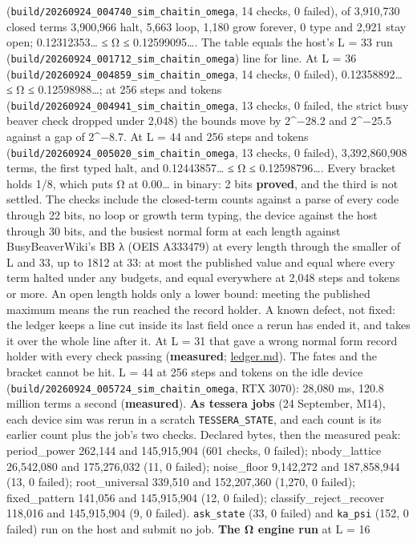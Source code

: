 \begin{description}
(\texttt{build/\allowbreak{}20260924\_\allowbreak{}004740\_\allowbreak{}sim\_\allowbreak{}chaitin\_\allowbreak{}omega}, 14 checks, 0 failed), of 3,910,730 closed terms 3,900,966 halt, 5,663 loop, 1,180 grow forever, 0 type and 2,921 stay open; 0.12312353… ≤ Ω ≤ 0.12599095…. The table equals the host's L = 33 run (\texttt{build/\allowbreak{}20260924\_\allowbreak{}001712\_\allowbreak{}sim\_\allowbreak{}chaitin\_\allowbreak{}omega}) line for line. At L = 36 (\texttt{build/\allowbreak{}20260924\_\allowbreak{}004859\_\allowbreak{}sim\_\allowbreak{}chaitin\_\allowbreak{}omega}, 14 checks, 0 failed), 0.12358892… ≤ Ω ≤ 0.12598988…; at 256 steps and tokens (\texttt{build/\allowbreak{}20260924\_\allowbreak{}004941\_\allowbreak{}sim\_\allowbreak{}chaitin\_\allowbreak{}omega}, 13 checks, 0 failed, the strict busy beaver check dropped under 2,048) the bounds move by 2\textasciicircum{}−28.2 and 2\textasciicircum{}−25.5 against a gap of 2\textasciicircum{}−8.7. At L = 44 and 256 steps and tokens (\texttt{build/\allowbreak{}20260924\_\allowbreak{}005020\_\allowbreak{}sim\_\allowbreak{}chaitin\_\allowbreak{}omega}, 13 checks, 0 failed), 3,392,860,908 terms, the first typed halt, and 0.12443857… ≤ Ω ≤ 0.12598796…. Every bracket holds 1/8, which puts Ω at 0.00… in binary: 2 bits \textbf{proved}, and the third is not settled. The checks include the closed-term counts against a parse of every code through 22 bits, no loop or growth term typing, the device against the host through 30 bits, and the busiest normal form at each length against BusyBeaverWiki's BB λ (OEIS A333479) at every length through the smaller of L and 33, up to 1812 at 33: at most the published value and equal where every term halted under any budgets, and equal everywhere at 2,048 steps and tokens or more. An open length holds only a lower bound: meeting the published maximum means the run reached the record holder. A known defect, not fixed: the ledger keeps a line cut inside its last field once a rerun has ended it, and takes it over the whole line after it. At L = 31 that gave a wrong normal form record holder with every check passing (\textbf{measured}; \hyperref[chap:ledger]{ledger.md}). The fates and the bracket cannot be hit. L = 44 at 256 steps and tokens on the idle device (\texttt{build/\allowbreak{}20260924\_\allowbreak{}005724\_\allowbreak{}sim\_\allowbreak{}chaitin\_\allowbreak{}omega}, RTX 3070): 28,080 ms, 120.8 million terms a second (\textbf{measured}). \textbf{As tessera jobs} (24 September, M14), each device sim was rerun in a scratch \texttt{TESSERA\_\allowbreak{}STATE}, and each count is its earlier count plus the job's two checks. Declared bytes, then the measured peak: period\_\allowbreak{}power 262,144 and 145,915,904 (601 checks, 0 failed); nbody\_\allowbreak{}lattice 26,542,080 and 175,276,032 (11, 0 failed); noise\_\allowbreak{}floor 9,142,272 and 187,858,944 (13, 0 failed); root\_\allowbreak{}universal 339,510 and 152,207,360 (1,270, 0 failed); fixed\_\allowbreak{}pattern 141,056 and 145,915,904 (12, 0 failed); classify\_\allowbreak{}reject\_\allowbreak{}recover 118,016 and 145,915,904 (9, 0 failed). \texttt{ask\_\allowbreak{}state} (33, 0 failed) and \texttt{ka\_\allowbreak{}psi} (152, 0 failed) run on the host and submit no job. \textbf{The Ω engine run} at L = 16 
\end{description}
